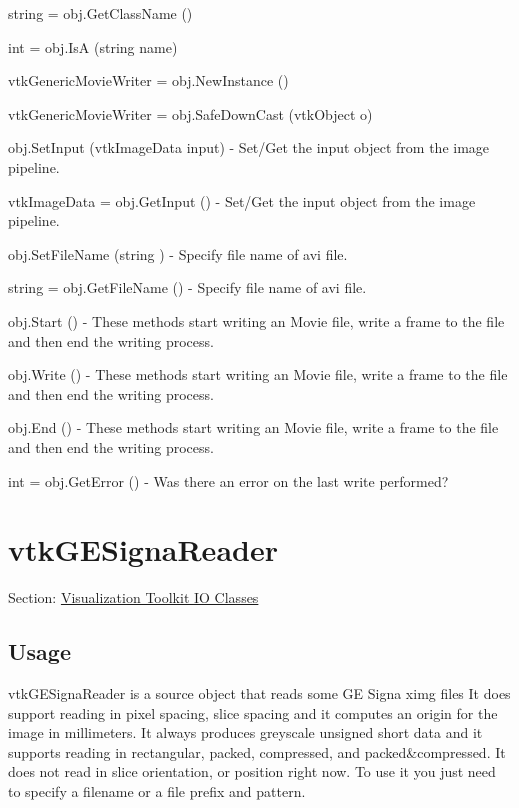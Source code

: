 \begin{DoxyItemize}
\item {\ttfamily string = obj.\-Get\-Class\-Name ()}  
\item {\ttfamily int = obj.\-Is\-A (string name)}  
\item {\ttfamily vtk\-Generic\-Movie\-Writer = obj.\-New\-Instance ()}  
\item {\ttfamily vtk\-Generic\-Movie\-Writer = obj.\-Safe\-Down\-Cast (vtk\-Object o)}  
\item {\ttfamily obj.\-Set\-Input (vtk\-Image\-Data input)} -\/ Set/\-Get the input object from the image pipeline.  
\item {\ttfamily vtk\-Image\-Data = obj.\-Get\-Input ()} -\/ Set/\-Get the input object from the image pipeline.  
\item {\ttfamily obj.\-Set\-File\-Name (string )} -\/ Specify file name of avi file.  
\item {\ttfamily string = obj.\-Get\-File\-Name ()} -\/ Specify file name of avi file.  
\item {\ttfamily obj.\-Start ()} -\/ These methods start writing an Movie file, write a frame to the file and then end the writing process.  
\item {\ttfamily obj.\-Write ()} -\/ These methods start writing an Movie file, write a frame to the file and then end the writing process.  
\item {\ttfamily obj.\-End ()} -\/ These methods start writing an Movie file, write a frame to the file and then end the writing process.  
\item {\ttfamily int = obj.\-Get\-Error ()} -\/ Was there an error on the last write performed?  
\end{DoxyItemize}\hypertarget{vtkio_vtkgesignareader}{}\section{vtk\-G\-E\-Signa\-Reader}\label{vtkio_vtkgesignareader}
Section\-: \hyperlink{sec_vtkio}{Visualization Toolkit I\-O Classes} \hypertarget{vtkwidgets_vtkxyplotwidget_Usage}{}\subsection{Usage}\label{vtkwidgets_vtkxyplotwidget_Usage}
vtk\-G\-E\-Signa\-Reader is a source object that reads some G\-E Signa ximg files It does support reading in pixel spacing, slice spacing and it computes an origin for the image in millimeters. It always produces greyscale unsigned short data and it supports reading in rectangular, packed, compressed, and packed\&compressed. It does not read in slice orientation, or position right now. To use it you just need to specify a filename or a file prefix and pattern.


